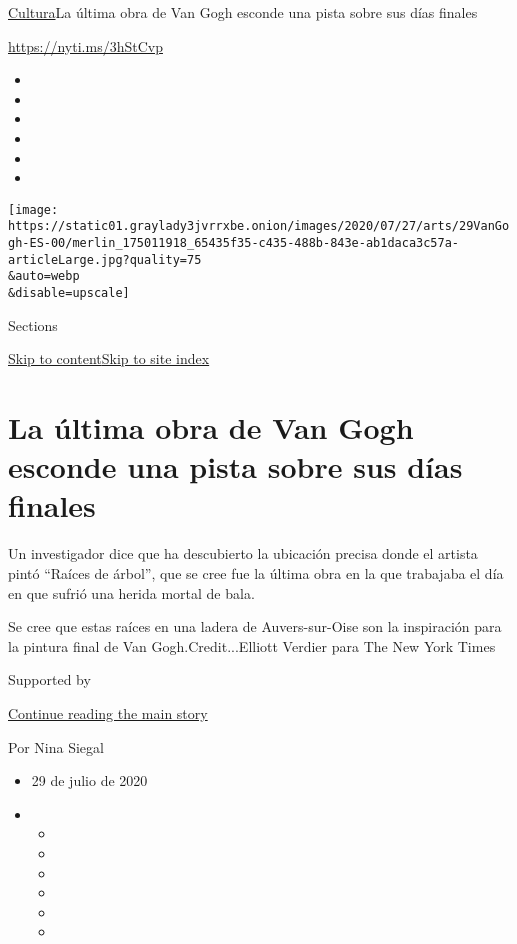 \href{/es/section/cultura}{Cultura}\textbar{}La última obra de Van Gogh
esconde una pista sobre sus días finales

\url{https://nyti.ms/3hStCvp}

\begin{itemize}
\item
\item
\item
\item
\item
\item
\end{itemize}

\texttt{[image: https://static01.graylady3jvrrxbe.onion/images/2020/07/27/arts/29VanGogh-ES-00/merlin\_175011918\_65435f35-c435-488b-843e-ab1daca3c57a-articleLarge.jpg?quality=75\\\&auto=webp\\\&disable=upscale]}

Sections

\protect\hyperlink{site-content}{Skip to
content}\protect\hyperlink{site-index}{Skip to site index}

\hypertarget{la-uxfaltima-obra-de-van-gogh-esconde-una-pista-sobre-sus-duxedas-finales}{%
\section{La última obra de Van Gogh esconde una pista sobre sus días
finales}\label{la-uxfaltima-obra-de-van-gogh-esconde-una-pista-sobre-sus-duxedas-finales}}

Un investigador dice que ha descubierto la ubicación precisa donde el
artista pintó ``Raíces de árbol'', que se cree fue la última obra en la
que trabajaba el día en que sufrió una herida mortal de bala.

Se cree que estas raíces en una ladera de Auvers-sur-Oise son la
inspiración para la pintura final de Van Gogh.Credit...Elliott Verdier
para The New York Times

Supported by

\protect\hyperlink{after-sponsor}{Continue reading the main story}

Por Nina Siegal

\begin{itemize}
\item
  29 de julio de 2020
\item
  \begin{itemize}
  \item
  \item
  \item
  \item
  \item
  \item
  \end{itemize}
\end{itemize}

